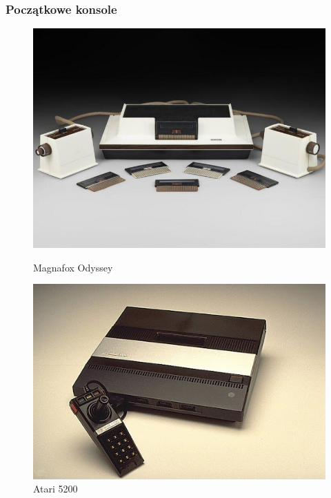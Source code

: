 \documentclass[8pt]{beamer}
\begin{document}
\begin{frame}
\frametitle{Początkowe konsole}
    \begin{figure}[ht]
        \begin{minipage}[b]{0.45\linewidth}
            \centering
            \includegraphics[width=\textwidth]{magnafox.jpg}
	    \caption{Magnafox Odyssey}
            \label{fig:a}
        \end{minipage}
        \hspace{0.5cm}
        \begin{minipage}[b]{0.45\linewidth}
            \centering
            \includegraphics[width=\textwidth]{atari5200.jpg}
            \caption{Atari 5200}
            \label{fig:b}
        \end{minipage}
    \end{figure}
\end{frame}
\end{document}
